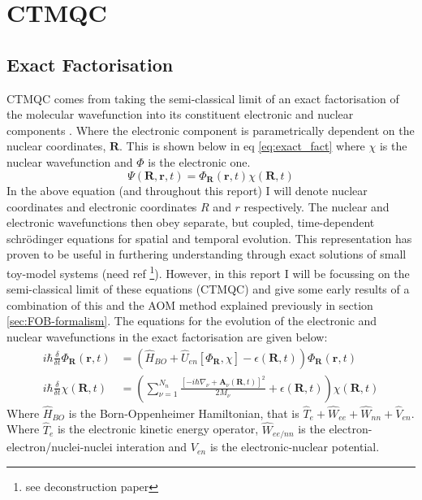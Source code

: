
\chapter{CTMQC}
\label{chap:CTMQC}


\section{Exact Factorisation}
CTMQC comes from taking the semi-classical limit of an exact factorisation of the molecular wavefunction into its constituent electronic and nuclear components \cite{abedi_exact_2010}. Where the electronic component is parametrically dependent on the nuclear coordinates, $\textbf{R}$. This is shown below in eq \eqref{eq:exact_fact} where $\chi$ is the nuclear wavefunction and $\Phi$ is the electronic one.
\begin{equation}
 \Psi(\textbf{R}, \textbf{r}, t) = \Phi_{\textbf{R}}(\textbf{r}, t) \chi(\textbf{R}, t)
 \label{eq:exact_fact}
 \end{equation}
In the above equation (and throughout this report) I will denote nuclear coordinates and electronic coordinates $R$ and $r$ respectively. The nuclear and electronic wavefunctions then obey separate, but coupled, time-dependent schr\"odinger equations for spatial and temporal evolution. This representation has proven to be useful in furthering understanding through exact solutions of small toy-model systems (need ref \footnote{see deconstruction paper}). However, in this report I will be focussing on the semi-classical limit of these equations (CTMQC) and give some early results of a combination of this and the AOM method explained previously in section \ref{sec:FOB-formalism}.
The equations for the evolution of the electronic and nuclear wavefunctions in the exact factorisation \cite{abedi_exact_2010} are given below:
\begin{align}
  i\hbar \frac{\delta}{\delta t} \Phi_{\textbf{R}}(\textbf{r}, t) &= \left( \hat{H}_{BO} + \hat{U}_{en}\left[ \Phi_{\textbf{R}}, \chi\right] - \epsilon(\textbf{R}, t) \right) \Phi_{\textbf{R}} (\textbf{r}, t)
  \label{eq:electronic_exact}
\\
i\hbar \frac{\delta}{\delta t} \chi (\textbf{R}, t) &= \left( \sum_{\nu = 1}^{N_{n}} \frac{[-i\hbar\nabla_{\nu} + \textbf{A}_{\nu}(\textbf{R}, t)]^2}{2 M_{\nu}} + \epsilon(\textbf{R}, t)\right) \chi (\textbf{R}, t)
  \label{eq:nuclear_exact}
\end{align}
Where $\hat{H}_{BO}$ is the Born-Oppenheimer Hamiltonian, that is $\hat{T}_{e} + \hat{W}_{ee} + \hat{W}_{nn} + \hat{V}_{en}$. Where $\hat{T}_{e}$ is the electronic kinetic energy operator, $\hat{W}_{ee/nn}$ is the electron-electron/nuclei-nuclei interation and $V_{en}$ is the electronic-nuclear potential.
